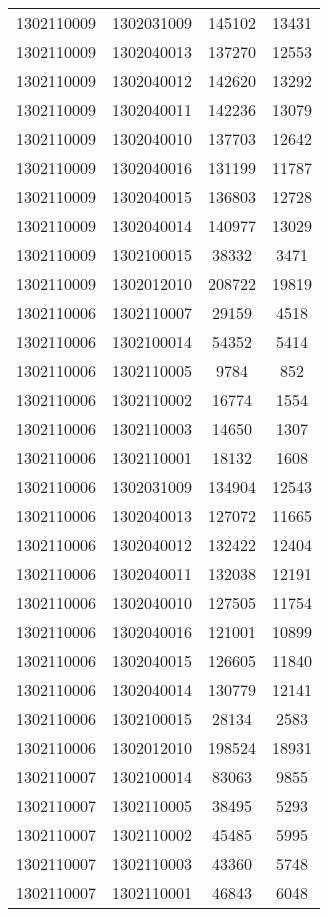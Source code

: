 \begin{longtable}[h]{llcc}
		1302110009 & 1302031009 & 145102 & 13431\\
		1302110009 & 1302040013 & 137270 & 12553\\
		1302110009 & 1302040012 & 142620 & 13292\\
		1302110009 & 1302040011 & 142236 & 13079\\
		1302110009 & 1302040010 & 137703 & 12642\\
		1302110009 & 1302040016 & 131199 & 11787\\
		1302110009 & 1302040015 & 136803 & 12728\\
		1302110009 & 1302040014 & 140977 & 13029\\
		1302110009 & 1302100015 & 38332 & 3471\\
		1302110009 & 1302012010 & 208722 & 19819\\
		1302110006 & 1302110007 & 29159 & 4518\\
		1302110006 & 1302100014 & 54352 & 5414\\
		1302110006 & 1302110005 & 9784 & 852\\
		1302110006 & 1302110002 & 16774 & 1554\\
		1302110006 & 1302110003 & 14650 & 1307\\
		1302110006 & 1302110001 & 18132 & 1608\\
		1302110006 & 1302031009 & 134904 & 12543\\
		1302110006 & 1302040013 & 127072 & 11665\\
		1302110006 & 1302040012 & 132422 & 12404\\
		1302110006 & 1302040011 & 132038 & 12191\\
		1302110006 & 1302040010 & 127505 & 11754\\
		1302110006 & 1302040016 & 121001 & 10899\\
		1302110006 & 1302040015 & 126605 & 11840\\
		1302110006 & 1302040014 & 130779 & 12141\\
		1302110006 & 1302100015 & 28134 & 2583\\
		1302110006 & 1302012010 & 198524 & 18931\\
		1302110007 & 1302100014 & 83063 & 9855\\
		1302110007 & 1302110005 & 38495 & 5293\\
		1302110007 & 1302110002 & 45485 & 5995\\
		1302110007 & 1302110003 & 43360 & 5748\\
		1302110007 & 1302110001 & 46843 & 6048\\

\end{longtable}
